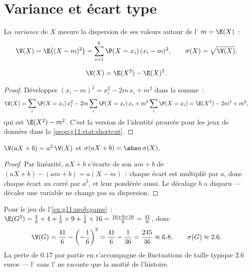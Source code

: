 \section{Variance et écart type}

\begin{definition}[Variance]\label{def:g11:prob:variance}
La \emph{variance} de $X$ mesure la dispersion de ses
valeurs autour de l' $m = \E(X)$~:
\[
\V(X) = \E\bigl((X - m)^2\bigr)
= \sum_{i=1}^{k} \P(X = x_i)\,(x_i - m)^2,
\qquad
\sigma(X) = \sqrt{\V(X)} .
\]
\end{definition}

\begin{proposition}\label{prop:g11:prob:konig}
\[
\V(X) = \E(X^2) - \E(X)^2 .
\]
\end{proposition}

\begin{proof}
Développer $(x_i - m)^2 = x_i^2 - 2m\,x_i + m^2$ dans la somme~:
\[
\V(X) = \sum_i \P(X = x_i)\,x_i^2
- 2m \sum_i \P(X = x_i)\,x_i + m^2\sum_i \P(X = x_i)
= \E(X^2) - 2m^2 + m^2 ,
\]
qui est $\E(X^2) - m^2$. C'est la version  de
l'identité prouvée pour les jeux de données dans la
\cref{prop:g11:stat:shortcut}.
\end{proof}

\begin{proposition}\label{prop:g11:prob:affine}
$\V(aX + b) = a^2\,\V(X)$ et $\sigma(aX + b) = \abs a\,\sigma(X)$.
\end{proposition}

\begin{proof}
Par linéarité, $aX + b$ s'écarte de son  $a m + b$ de
$(aX + b) - (am + b) = a(X - m)$~: chaque écart est multiplié par $a$,
donc chaque écart au carré par $a^2$, et leur  pondérée aussi. Le
décalage $b$ a disparu --- décaler une variable ne change pas sa
dispersion.
\end{proof}

\begin{example}\label{ex:g11:prob:variance}
Pour le jeu de l'\cref{ex:g11:prob:game}~:
$\E(G^2) = \frac46 \times 4 + \frac16 \times 9 + \frac16 \times 16
= \frac{16 + 9 + 16}{6} = \frac{41}{6}$, donc
\[
\V(G) = \frac{41}{6} - \left(-\frac16\right)^2
= \frac{41}{6} - \frac{1}{36} = \frac{245}{36} \approx 6.8,
\qquad
\sigma(G) \approx 2.6 .
\]
La perte de $0.17$ par partie en  s'accompagne de fluctuations de
taille typique $2.6$ euros --- l' sans l' ne raconte
que la moitié de l'histoire.
\end{example}

